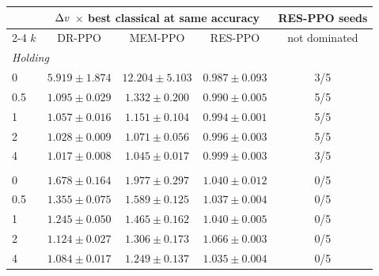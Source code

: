 \begin{tabular}{lcccc}
\toprule
 & \multicolumn{3}{c}{$\Delta v$ $\times$ best classical at same accuracy} & RES-PPO seeds \\
\cmidrule(lr){2-4}
$k$ & DR-PPO & MEM-PPO & RES-PPO & not dominated \\
\midrule
\multicolumn{5}{l}{\emph{Holding}} \\
0 & $5.919 \pm 1.874$ & $12.204 \pm 5.103$ & $0.987 \pm 0.093$ & 3/5 \\
0.5 & $1.095 \pm 0.029$ & $1.332 \pm 0.200$ & $0.990 \pm 0.005$ & 5/5 \\
1 & $1.057 \pm 0.016$ & $1.151 \pm 0.104$ & $0.994 \pm 0.001$ & 5/5 \\
2 & $1.028 \pm 0.009$ & $1.071 \pm 0.056$ & $0.996 \pm 0.003$ & 5/5 \\
4 & $1.017 \pm 0.008$ & $1.045 \pm 0.017$ & $0.999 \pm 0.003$ & 3/5 \\
\addlinespace
\multicolumn{5}{l}{\emph{Recovery}} \\
0 & $1.678 \pm 0.164$ & $1.977 \pm 0.297$ & $1.040 \pm 0.012$ & 0/5 \\
0.5 & $1.355 \pm 0.075$ & $1.589 \pm 0.125$ & $1.037 \pm 0.004$ & 0/5 \\
1 & $1.245 \pm 0.050$ & $1.465 \pm 0.162$ & $1.040 \pm 0.005$ & 0/5 \\
2 & $1.124 \pm 0.027$ & $1.306 \pm 0.173$ & $1.066 \pm 0.003$ & 0/5 \\
4 & $1.084 \pm 0.017$ & $1.249 \pm 0.137$ & $1.035 \pm 0.004$ & 0/5 \\
\bottomrule
\end{tabular}
